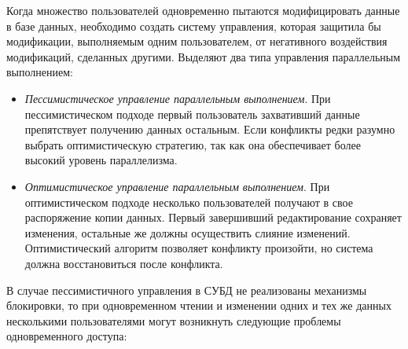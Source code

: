 Когда множество пользователей одновременно пытаются модифицировать данные в базе данных, необходимо создать систему управления, которая защитила бы модификации, выполняемым одним пользователем, от негативного воздействия модификаций, сделанных другими.
Выделяют два типа управления параллельным выполнением:
\begin{itemize}
	\item \textit{Пессимистическое управление параллельным выполнением}. При пессимистическом подходе первый пользователь захвативший данные препятствует получению данных остальным. Если конфликты редки разумно выбрать оптимистическую стратегию, так как она обеспечивает более высокий уровень параллелизма.
	\item \textit{Оптимистическое управление параллельным выполнением}. При оптимистическом подходе несколько пользователей получают в свое распоряжение копии данных. Первый завершивший редактирование сохраняет изменения, остальные же должны осуществить слияние изменений. Оптимистический алгоритм позволяет конфликту произойти, но система должна восстановиться после конфликта.
\end{itemize}
В случае пессимистичного управления в СУБД не реализованы механизмы блокировки, то при одновременном чтении и изменении одних и тех же данных несколькими пользователями могут возникнуть следующие проблемы одновременного доступа:
